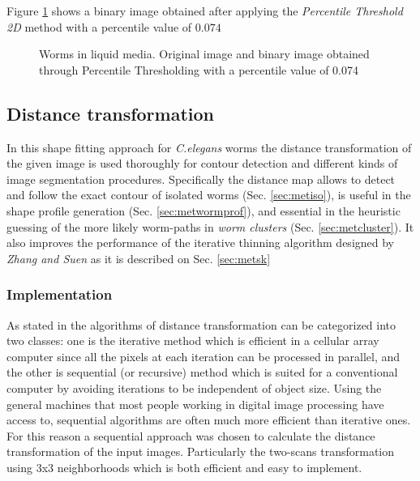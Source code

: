 Figure \ref{fig:wormthres} shows a binary image obtained after applying
the \emph{Percentile Threshold 2D} method with a percentile value of $0.074$

\begin{figure}[h t b p ! H]
  \centering
\qquad
\caption{Worms in liquid media. Original image and binary image obtained through
Percentile Thresholding with a percentile value of 0.074}
  \label{fig:wormthres}
\end{figure}

\subsection{Distance transformation}
\label{sec:metdt}

In this shape fitting approach for \emph{C.elegans} worms the distance transformation
of the given image is used thoroughly for contour detection and different kinds of image 
segmentation procedures. Specifically the distance map allows to detect and follow
the exact contour of isolated worms (Sec. \ref{sec:metiso}), 
is useful in the shape profile generation (Sec. \ref{sec:metwormprof}), and essential in the heuristic
guessing of the more likely worm-paths in \emph{worm clusters} (Sec. \ref{sec:metcluster}).
It also improves the performance of the iterative thinning algorithm designed by 
\emph{Zhang and Suen} \cite{thinning} as it is described on Sec. \ref{sec:metsk}

\subsubsection{Implementation}
\label{sec:dtimp}

 As stated in \cite[p.196]{fastdt} the algorithms of distance transformation can be categorized into two classes: one is the iterative 
 method which is efficient in a cellular array computer since all the pixels at each iteration can be processed in parallel, and the other 
is sequential (or recursive) method which is suited for a conventional computer by
 avoiding iterations to be independent of object size. 
Using the general machines that most people working in digital image processing
 have access to, sequential algorithms are often much more efficient than
 iterative ones. For this reason a sequential approach was chosen to calculate the
distance transformation of the input images. Particularly the two-scans transformation
using 3x3 neighborhoods \cite{fastdt} which is both efficient and easy to implement.\\

